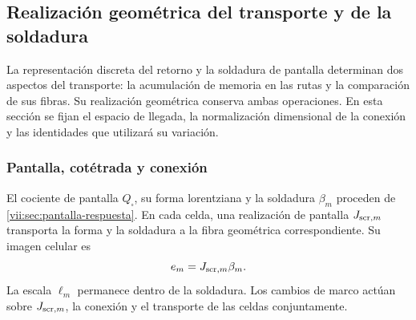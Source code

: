 
\subsection{Realización geométrica del transporte y de la soldadura}
\label{vii:sec:realizacion-cartan}

La representación discreta del retorno y la soldadura de pantalla
determinan dos aspectos del transporte: la acumulación de memoria en
las rutas y la comparación de sus fibras. Su realización geométrica
conserva ambas operaciones. En esta sección se fijan el espacio de
llegada, la normalización dimensional de la conexión y las identidades
que utilizará su variación.

\subsubsection{Pantalla, cotétrada y conexión}

El cociente de pantalla \(Q_\square\), su forma lorentziana y la
soldadura \(\beta_m\) proceden de
\ref{vii:sec:pantalla-respuesta}. En cada celda, una realización de
pantalla \(J_{{\rm scr},m}\) transporta la forma y la soldadura
a la fibra geométrica correspondiente. Su imagen celular es
\[
 e_m=J_{{\rm scr},m}\beta_m.
\]
La escala \(\ell_m\) permanece dentro de la soldadura. Los
cambios de marco actúan sobre \(J_{{\rm scr},m}\), la conexión
y el transporte de las celdas conjuntamente.

